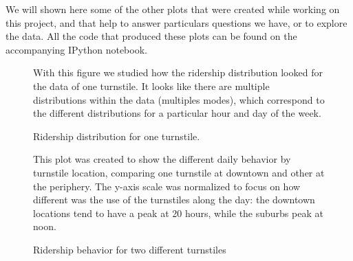 \documentclass[a4paper,12pt,english]{sphinxmanual}
\begin{document}
We will shown here some of the other plots that were created while working on
this project, and that help to answer particulars questions we have, or to
explore the data. All the code that produced these plots can be found on the
accompanying IPython notebook.
\begin{figure}[htbp]
\centering
\capstart

\caption{Ridership distribution for one turnstile.}{\small 
With this figure we studied how the ridership distribution looked for the
data of one turnstile. It looks like there are multiple distributions within
the data (multiples modes), which correspond to the different distributions
for a particular hour and day of the week.
}\label{section3:figure42}\end{figure}
\begin{figure}[htbp]
\centering
\capstart

\caption{Ridership behavior for two different turnstiles}{\small 
This plot was created to show the different daily behavior by turnstile
location, comparing one turnstile at downtown and other at the periphery. The
y-axis scale was normalized to focus on how different was the use of the
turnstiles along the day: the downtown locations tend to have a peak
at 20 hours, while the suburbs peak at noon.
}\label{section3:figure43}\end{figure}
\end{document}
